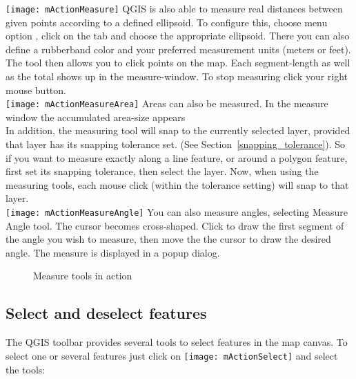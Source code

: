 \texttt{[image: mActionMeasure]}
QGIS is also able to measure real distances between given
points according to a defined ellipsoid. To configure this, choose menu option
 \arrow {},
click on the  tab and choose the appropriate ellipsoid. There
you can also define a rubberband color and your preferred measurement units
(meters or feet). The tool then allows you to click points on the map. Each
segment-length as well as the total shows up in the measure-window. To stop measuring click your right mouse button. \\
\texttt{[image: mActionMeasureArea]} Areas can also be measured.
In the measure window the accumulated area-size appears  \\
In addition, the measuring tool will snap to the currently selected layer, provided that layer has its snapping tolerance set. (See Section~\ref{snapping_tolerance}). So if you want to measure exactly along a line feature, or around a polygon feature, first set its snapping tolerance, then select the layer. Now, when using the measuring tools, each mouse click (within the tolerance setting) will snap to that layer. \\
\texttt{[image: mActionMeasureAngle]}
You can also measure angles, selecting Measure Angle tool. The cursor becomes
cross-shaped. Click to draw the first segment of the angle you wish to
measure, then move the the cursor to draw the desired angle. The measure
is displayed in a popup dialog.

\begin{figure}[ht]
\centering
     \hspace{0.33cm}
     \hspace{0.33cm}
   \caption{Measure tools in action \nixcaption} \label{fig:measure}
\end{figure}

\subsection{Select and deselect features}\label{sec:selection}

The QGIS toolbar provides several tools to select features in the map canvas. 
To select one or several features just click on 
\texttt{[image: mActionSelect]} and select the tools:

